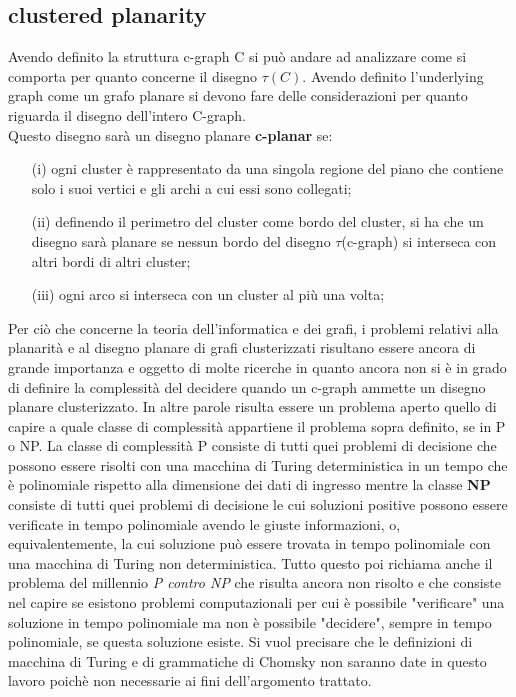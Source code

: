 {\subsection{clustered planarity}
Avendo definito la struttura c-graph C si può andare ad analizzare come si comporta per quanto concerne il disegno $\tau(C)$. 
Avendo definito l'underlying graph come un grafo planare si devono fare delle considerazioni per quanto riguarda il disegno dell'intero C-graph.\\
Questo disegno sarà un disegno planare \textbf{c-planar} se:\\
\begin{itemize}
	\item[(i)] ogni cluster è rappresentato da una singola regione del piano che contiene solo i suoi vertici e gli archi a cui essi sono collegati;
	\item[(ii)] definendo il perimetro del cluster come bordo del cluster, si ha che un disegno sarà planare se nessun bordo del disegno $\tau$(c-graph) si interseca con altri bordi di altri cluster;
	\item[(iii)] ogni arco si interseca con un cluster al più una volta;
\end{itemize}
Per ciò che concerne la teoria dell'informatica e dei grafi, i problemi relativi alla planarità e al disegno planare di grafi clusterizzati risultano essere ancora di grande importanza e oggetto di molte ricerche in quanto ancora non si è in grado di definire la complessità del decidere quando un c-graph ammette un disegno planare clusterizzato.
In altre parole risulta essere un problema aperto quello di capire a quale classe di complessità appartiene il problema sopra definito, se in P o NP. La classe di complessità P consiste di tutti quei problemi di decisione che possono essere risolti con una macchina di Turing deterministica in un tempo che è polinomiale rispetto alla dimensione dei dati di ingresso mentre la classe \textbf{NP} consiste di tutti quei problemi di decisione le cui soluzioni positive possono essere verificate in tempo polinomiale avendo le giuste informazioni, o, equivalentemente, la cui soluzione può essere trovata in tempo polinomiale con una macchina di Turing non deterministica. Tutto questo poi richiama anche il problema del millennio \textit{P contro NP} che risulta ancora non risolto e che consiste nel capire se esistono problemi computazionali per cui è possibile "verificare" una soluzione in tempo polinomiale ma non è possibile "decidere", sempre in tempo polinomiale, se questa soluzione esiste. 
Si vuol precisare che le definizioni di macchina di Turing e di grammatiche di Chomsky non saranno date in questo lavoro poichè non necessarie ai fini dell'argomento trattato.
}
